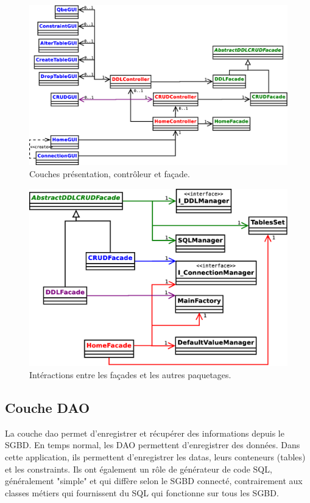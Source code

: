 \begin{figure}[!h]
\centering
\includegraphics[width=14cm]{images/facades_crud_ddl.eps}
\caption{Couches présentation, contrôleur et façade.}
\label{trois_premières_couches}
\end{figure}

\begin{figure}[H]
\centering
\includegraphics[width=14cm]{images/facades_managers.eps}
\caption{Intéractions entre les façades et les autres paquetages.}
\label{facades_et_managers}
\end{figure}

\subsection{Couche DAO}
La couche \gls{dao} permet d'enregistrer et récupérer des informations depuis le SGBD.
En temps normal, les DAO permettent d'enregistrer des données.
Dans cette application, ils permettent d'enregistrer les \glspl{data}, leurs conteneurs (\glspl{table}) et les \glspl{constraint}.
Ils ont également un rôle de générateur de code SQL, généralement "simple" et qui diffère selon le SGBD connecté, contrairement aux classes métiers qui fournissent du SQL qui fonctionne sur tous les SGBD.

